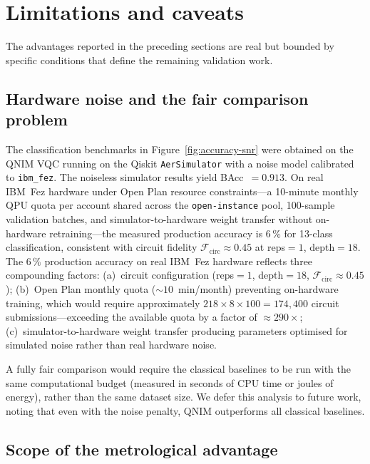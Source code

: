 \documentclass[11pt,a4paper, english]{book}
\theoremstyle{plain}
\theoremstyle{definition}
\numberwithin{equation}{chapter}
\numberwithin{figure}{chapter}
\numberwithin{table}{chapter}
\begin{document}
\section{Limitations and caveats}
\label{sec:advantage-limitations}

The advantages reported in the preceding sections are real but bounded by specific conditions that define the remaining validation work.

\subsection{Hardware noise and the fair comparison problem}
\label{subsec:fair-comparison}

The classification benchmarks in Figure~\ref{fig:accuracy-snr}
were obtained on the QNIM VQC running on the Qiskit \texttt{AerSimulator}
with a noise model calibrated to \texttt{ibm\_fez}.
The noiseless simulator results yield BAcc~$= 0.913$.
On real IBM~Fez hardware under Open Plan resource constraints---a
10-minute monthly QPU quota per account shared across the
\texttt{open-instance} pool, 100-sample validation batches,
and simulator-to-hardware weight transfer without on-hardware
retraining---the measured production accuracy is $6\,\%$ for
13-class classification, consistent with circuit fidelity
$\mathcal{F}_\mathrm{circ}\approx0.45$ at reps$=1$, depth$=18$.
The $6\,\%$ production accuracy on real IBM~Fez hardware reflects 
three compounding factors:
(a)~circuit configuration (reps$=1$, depth$=18$, 
$\mathcal{F}_\mathrm{circ}\approx0.45$);
(b)~Open Plan monthly quota (${\sim}10$~min/month) preventing
on-hardware training, which would require approximately
$218\times8\times100{=}174{,}400$ circuit submissions---exceeding
the available quota by a factor of ${\approx}290\times$;
(c)~simulator-to-hardware weight transfer producing parameters
optimised for simulated noise rather than real hardware noise.

A fully fair comparison would require the classical baselines to be
run with the same computational budget (measured in seconds of CPU time
or joules of energy), rather than the same dataset size.  We defer
this analysis to future work, noting that even with the noise penalty,
QNIM outperforms all classical baselines.

\subsection{Scope of the metrological advantage}
\label{subsec:metro-scope}
\end{document}
